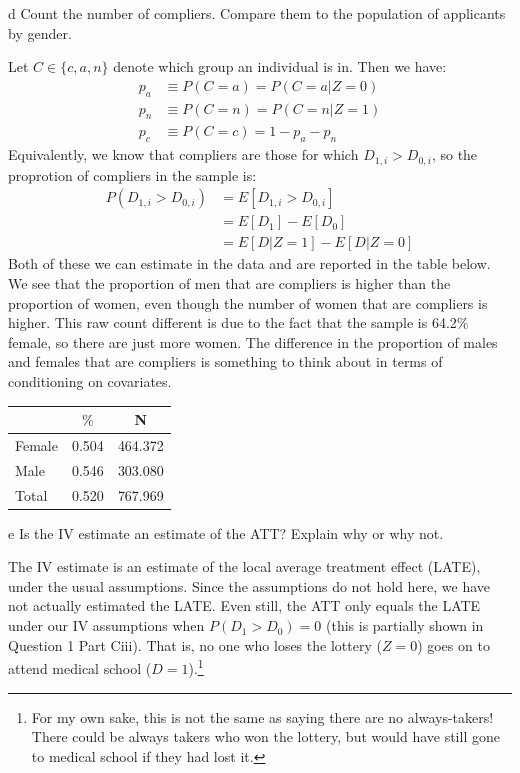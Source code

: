 \documentclass{article}
\begin{document}
\begin{problem}{d}
Count the number of compliers. Compare them to the population of applicants by gender.
\end{problem}
\begin{solution}
Let $C \in \{c,a,n \}$ denote which group an individual is in. Then we have:
\begin{align*}
    p_a &\equiv P(C=a) = P(C=a|Z=0) \\
    p_n &\equiv P(C=n) = P(C=n|Z=1) \\
    p_c &\equiv P(C=c) = 1 - p_a - p_n
\end{align*}
Equivalently, we know that compliers are those for which $D_{1,i}>D_{0,i}$, so the proprotion of compliers in the sample is:
\begin{align*}
    P(D_{1,i}>D_{0,i}) &= E[D_{1,i}>D_{0,i}] \\
    &= E[D_1] - E[D_0] \\
    &= E[D|Z=1] - E[D|Z=0]
\end{align*}
Both of these we can estimate in the data and are reported in the table below. We see that the proportion of men that are compliers is higher than the proportion of women, even though the number of women that are compliers is higher. This raw count different is due to the fact that the sample is 64.2\% female, so there are just more women. The difference in the proportion of males and females that are compliers is something to think about in terms of conditioning on covariates.

%
\begin{tabular}{l*{2}{c}}
\hline\hline
            &        $\%$&           N\\
\hline
Female      &       0.504&     464.372\\
Male        &       0.546&     303.080\\
Total       &       0.520&     767.969\\
\hline\hline
\end{tabular}
\end{solution}

\begin{problem}{e}
Is the IV estimate an estimate of the ATT? Explain why or why not.
\end{problem}
\begin{solution}
The IV estimate is an estimate of the local average treatment effect (LATE), under the usual assumptions. Since the assumptions do not hold here, we have not actually estimated the LATE. Even still, the ATT only equals the LATE under our IV assumptions when $P(D_1>D_0)=0$ (this is partially shown in Question 1 Part Ciii). That is, no one who loses the lottery ($Z=0$) goes on to attend medical school ($D=1$).\footnote{For my own sake, this is not the same as saying there are no always-takers! There could be always takers who won the lottery, but would have still gone to medical school if they had lost it.}
\end{solution}
\end{document}
